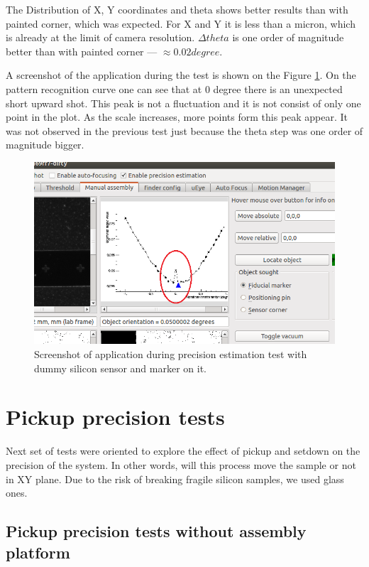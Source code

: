 The Distribution of X, Y coordinates and theta shows better results than with painted corner, which was expected. For X and Y it is less than a micron, which is already at the limit of camera resolution. $\Delta theta$ is one order of magnitude better than with painted corner --- $\approx 0.02  degree$.

A screenshot of the application during the test is shown on the Figure \ref{fig:zero_peak}. On the pattern recognition curve one can see that at 0 degree there is an unexpected short upward shot. This peak is not a fluctuation and it is not consist of only one point in the plot. As the scale increases, more points form this peak appear. It was not observed in the previous test just because the theta step was one order of magnitude bigger.

\begin{figure}[ht]\centering
\includegraphics[width=0.8\linewidth]{Data/Precision_tests/Upward_shot.png}
\caption{Screenshot of application during precision estimation test with dummy silicon sensor and marker on it.}
\label{fig:zero_peak}
\end{figure}

\section{Pickup precision tests}

Next set of tests were oriented to explore the effect of pickup and setdown on the precision of the system. In other words, will this process move the sample or not in XY plane. Due to the risk of breaking fragile silicon samples, we used glass ones.

\subsection{Pickup precision tests without assembly platform}

